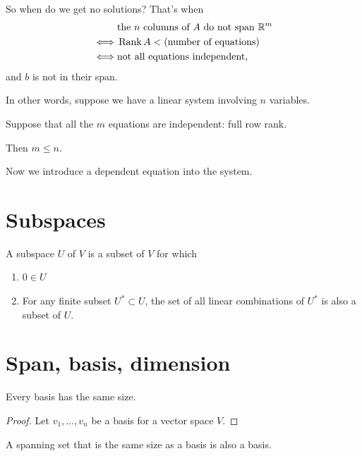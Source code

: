 So when do we get no solutions? That's when
\begin{align*}
  &\text{the $n$ columns of $A$ do not span $\mathbb{R}^m$}\\
  \iff &\operatorname{\mathrm{Rank}} A < \text{(number of equations)}\\
  \iff &\text{not all equations independent},
\end{align*}
and $b$ is not in their span.

In other words, suppose we have a linear system involving $n$ variables.

Suppose that all the $m$ equations are independent: full row rank.

Then $m \leq n$.

Now we introduce a dependent equation into the system.



\section{Subspaces}
A subspace $U$ of $V$ is a subset of $V$ for which
\begin{enumerate}
\item $0 \in  U$
\item For any finite subset $U^* \subset U$, the set of all linear combinations
  of $U^*$ is also a subset of $U$.
\end{enumerate}

\section{Span, basis, dimension}
\begin{theorem}
  Every basis has the same size.
\end{theorem}

\begin{proof} Let $v_1, \ldots, v_n$ be a basis for a vector space $V$.


\end{proof}

\begin{theorem}
  A spanning set that is the same size as a basis is also a basis.
\end{theorem}

